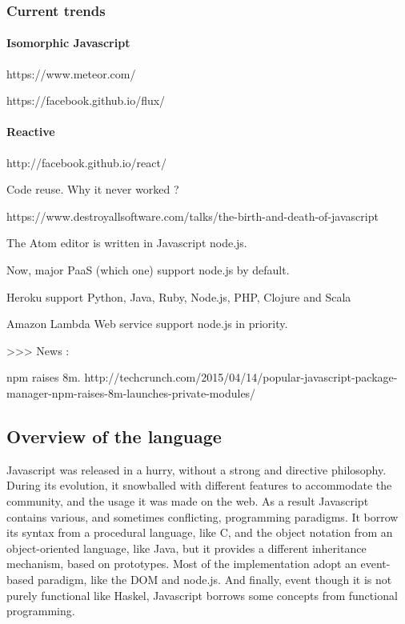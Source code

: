 \subsubsection{Current trends}


\paragraph{Isomorphic Javascript}

https://www.meteor.com/

https://facebook.github.io/flux/

\paragraph{Reactive}

http://facebook.github.io/react/

Code reuse.
Why it never worked ?





https://www.destroyallsoftware.com/talks/the-birth-and-death-of-javascript

The Atom editor is written in Javascript node.js.



Now, major PaaS (which one) support node.js by default.

Heroku support Python, Java, Ruby, Node.js, PHP, Clojure and Scala

Amazon Lambda Web service support node.js in priority.


>>> News :

npm raises 8m.
http://techcrunch.com/2015/04/14/popular-javascript-package-manager-npm-raises-8m-launches-private-modules/




\subsection{Overview of the language}

Javascript was released in a hurry, without a strong and directive philosophy.
During its evolution, it snowballed with different features to accommodate the community, and the usage it was made on the web. As a result Javascript contains various, and sometimes conflicting, programming paradigms.
It borrow its syntax from a procedural language, like C, and the object notation from an object-oriented language, like Java, but it provides a different inheritance mechanism, based on prototypes. Most of the implementation adopt an event-based paradigm, like the DOM and node.js.
And finally, event though it is not purely functional like Haskel, Javascript borrows some concepts from functional programming.

